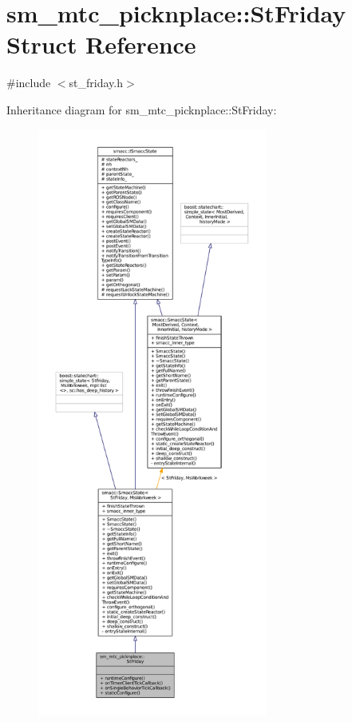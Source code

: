\hypertarget{structsm__mtc__picknplace_1_1StFriday}{}\section{sm\+\_\+mtc\+\_\+picknplace\+:\+:St\+Friday Struct Reference}
\label{structsm__mtc__picknplace_1_1StFriday}


{\ttfamily \#include $<$st\+\_\+friday.\+h$>$}



Inheritance diagram for sm\+\_\+mtc\+\_\+picknplace\+:\+:St\+Friday\+:
\nopagebreak
\begin{figure}[H]
\begin{center}
\leavevmode
\includegraphics[height=550pt]{structsm__mtc__picknplace_1_1StFriday__inherit__graph}
\end{center}
\end{figure}


